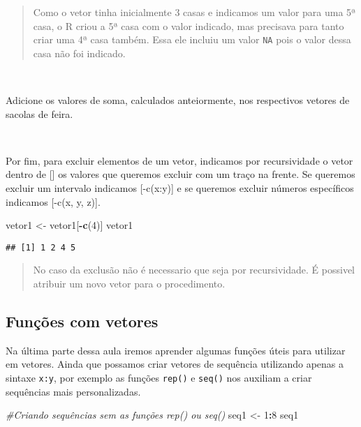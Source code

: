 \documentclass[]{book}
\newenvironment{Shaded}{\begin{snugshade}}{\end{snugshade}}
\newcommand{\CommentTok}[1]{\textcolor[rgb]{0.56,0.35,0.01}{\textit{#1}}}
\newcommand{\DecValTok}[1]{\textcolor[rgb]{0.00,0.00,0.81}{#1}}
\newcommand{\KeywordTok}[1]{\textcolor[rgb]{0.13,0.29,0.53}{\textbf{#1}}}
\newcommand{\NormalTok}[1]{#1}
\newcommand{\OperatorTok}[1]{\textcolor[rgb]{0.81,0.36,0.00}{\textbf{#1}}}
\newcommand{\StringTok}[1]{\textcolor[rgb]{0.31,0.60,0.02}{#1}}
\theoremstyle{definition}
\theoremstyle{definition}
\theoremstyle{definition}
\theoremstyle{remark}
\let\BeginKnitrBlock\begin \let\EndKnitrBlock\end
\begin{document}
\begin{quote}
Como o vetor tinha inicialmente 3 casas e indicamos um valor para uma 5ª casa, o R criou a 5ª casa com o valor indicado, mas precisava para tanto criar uma 4ª casa também. Essa ele incluiu um valor \texttt{NA} pois o valor dessa casa não foi indicado.
\end{quote}

~

\BeginKnitrBlock{exercise}
\protect\hypertarget{exr:unnamed-chunk-40}{}{\label{exr:unnamed-chunk-40} }Adicione os valores de soma, calculados anteiormente, nos respectivos vetores de sacolas de feira.
\EndKnitrBlock{exercise}

~

Por fim, para excluir elementos de um vetor, indicamos por recursividade o vetor dentro de {[}{]} os valores que queremos excluir com um traço na frente. Se queremos excluir um intervalo indicamos {[}-c(x:y){]} e se queremos excluir números específicos indicamos {[}-c(x, y, z){]}.

\begin{Shaded}
\begin{Highlighting}[]
\NormalTok{vetor1 <-}\StringTok{ }\NormalTok{vetor1[}\OperatorTok{-}\KeywordTok{c}\NormalTok{(}\DecValTok{4}\NormalTok{)]}
\NormalTok{vetor1}
\end{Highlighting}
\end{Shaded}

\begin{verbatim}
## [1] 1 2 4 5
\end{verbatim}

\begin{quote}
No caso da exclusão não é necessario que seja por recursividade. É possivel atribuir um novo vetor para o procedimento.
\end{quote}

\hypertarget{funuxe7uxf5es-com-vetores}{%
\subsection{Funções com vetores}\label{funuxe7uxf5es-com-vetores}}

Na última parte dessa aula iremos aprender algumas funções úteis para utilizar em vetores. Ainda que possamos criar vetores de sequência utilizando apenas a sintaxe \texttt{x:y}, por exemplo as funções \texttt{rep()} e \texttt{seq()} nos auxiliam a criar sequências mais personalizadas.

\begin{Shaded}
\begin{Highlighting}[]
\CommentTok{#Criando sequências sem as funções rep() ou seq()}
\NormalTok{seq1 <-}\StringTok{ }\DecValTok{1}\OperatorTok{:}\DecValTok{8}
\NormalTok{seq1}
\end{Highlighting}
\end{Shaded}
\end{document}

